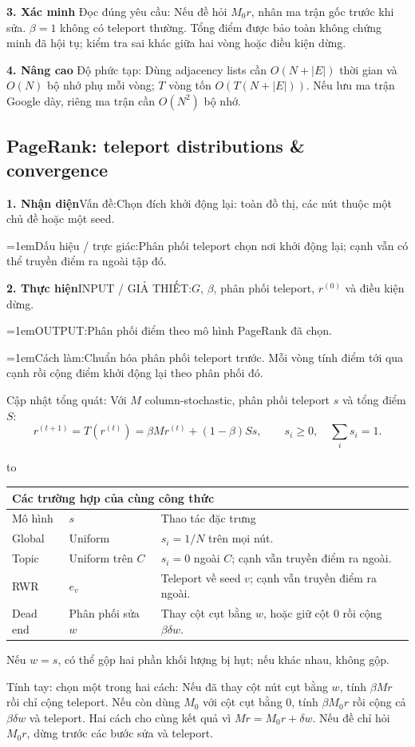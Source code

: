 \documentclass[10pt,a4paper,twocolumn]{article}
\newif\ifexamheadingprinted
\newcommand{\topic}[2]{%
  \global\examheadingprintedfalse\par\subsection{#2}\label{topic:#1}}
\newcommand{\key}[1]{#1:\enspace}
\newenvironment{examtable}[1]{%
  \par\addvspace{2pt}\noindent\hbox to \linewidth\bgroup\hfil
  \setlength{\tabcolsep}{4pt}%
  \renewcommand{\arraystretch}{1.12}\begin{tabular}{#1}%
}{\end{tabular}\hfil\egroup\par\addvspace{2pt}}
\newcommand{\algfield}[2]{\par\noindent\hangindent=1em\relax#1:\enspace#2}
\newcommand{\unitheading}[2]{%
  \par\addvspace{1pt}\noindent\textbf{#1. #2}\enspace}
\newcommand{\unitverification}{\unitheading{3}{Xác minh}}
\newcommand{\unitadvanced}{\unitheading{4}{Nâng cao}}
\newcommand{\unitfield}[4]{%
  \par\noindent\textbf{#1. #2}\enspace #3:\enspace #4}
\newcommand{\algsummary}[6]{%
  \begingroup\setlength{\parskip}{1pt}%
  \unitfield{1}{Nhận diện}{Vấn đề}{#1}%
  \algfield{Dấu hiệu / trực giác}{#2}%
  \if\relax\detokenize{#3}\relax\else\par\noindent#3\par\fi%
  \unitfield{2}{Thực hiện}{INPUT / GIẢ THIẾT}{#4}%
  \algfield{OUTPUT}{#5}%
  \algfield{Cách làm}{#6}\par\endgroup}
\begin{document}
\unitverification
\key{Đọc đúng yêu cầu} Nếu đề hỏi $M_0r$, nhân ma trận gốc trước khi sửa. $\beta=1$ không có teleport thường. Tổng điểm được bảo toàn không chứng minh đã hội tụ; kiểm tra sai khác giữa hai vòng hoặc điều kiện dừng.

\unitadvanced
\key{Độ phức tạp} Dùng adjacency lists cần $O(N+|E|)$ thời gian và $O(N)$ bộ nhớ phụ mỗi vòng; $T$ vòng tốn $O(T(N+|E|))$. Nếu lưu ma trận Google dày, riêng ma trận cần $O(N^2)$ bộ nhớ.
\topic{teleport}{PageRank: teleport distributions \& convergence}

\algsummary{Chọn đích khởi động lại: toàn đồ thị, các nút thuộc một chủ đề hoặc một seed.}{Phân phối teleport chọn nơi khởi động lại; cạnh vẫn có thể truyền điểm ra ngoài tập đó.}{}{$G$, $\beta$, phân phối teleport, $r^{(0)}$ và điều kiện dừng.}{Phân phối điểm theo mô hình PageRank đã chọn.}{Chuẩn hóa phân phối teleport trước. Mỗi vòng tính điểm tới qua cạnh rồi cộng điểm khởi động lại theo phân phối đó.}

\key{Cập nhật tổng quát} Với $M$ column-stochastic, phân phối teleport $s$ và tổng điểm $S$:
\[
\boxed{r^{(t+1)}=T(r^{(t)})=\beta Mr^{(t)}+(1-\beta)S s},
\qquad s_i\ge0,\quad\sum_i s_i=1.
\]

\begin{examtable}{@{}p{}p{}p{.51\columnwidth}@{}}
\toprule
\multicolumn{3}{l}{\textbf{Các trường hợp của cùng công thức}}\\
\midrule
Mô hình & $s$ & Thao tác đặc trưng \\
\midrule
Global & Uniform & $s_i=1/N$ trên mọi nút. \\
Topic & Uniform trên $C$ & $s_i=0$ ngoài $C$; cạnh vẫn truyền điểm ra ngoài. \\
RWR & $e_v$ & Teleport về seed $v$; cạnh vẫn truyền điểm ra ngoài. \\
Dead end & Phân phối sửa $w$ & Thay cột cụt bằng $w$, hoặc giữ cột 0 rồi cộng $\beta\delta w$. \\
\bottomrule
\end{examtable}
Nếu $w=s$, có thể gộp hai phần khối lượng bị hụt; nếu khác nhau, không gộp.
\par

\key{Tính tay: chọn một trong hai cách} Nếu đã thay cột nút cụt bằng $w$, tính $\beta Mr$ rồi chỉ cộng teleport. Nếu còn dùng $M_0$ với cột cụt bằng 0, tính $\beta M_0r$ rồi cộng cả $\beta\delta w$ và teleport. Hai cách cho cùng kết quả vì $Mr=M_0r+\delta w$. Nếu đề chỉ hỏi $M_0r$, dừng trước các bước sửa và teleport.
\end{document}
